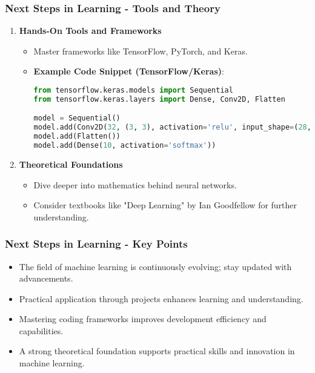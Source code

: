 \documentclass[aspectratio=169]{beamer}
\begin{document}
\begin{frame}[fragile]
    \frametitle{Next Steps in Learning - Tools and Theory}
    \begin{enumerate}
        \item \textbf{Hands-On Tools and Frameworks}
            \begin{itemize}
                \item Master frameworks like TensorFlow, PyTorch, and Keras.
                \item \textbf{Example Code Snippet (TensorFlow/Keras)}:
                \begin{lstlisting}[language=Python]
from tensorflow.keras.models import Sequential
from tensorflow.keras.layers import Dense, Conv2D, Flatten

model = Sequential()
model.add(Conv2D(32, (3, 3), activation='relu', input_shape=(28, 28, 1)))
model.add(Flatten())
model.add(Dense(10, activation='softmax'))
                \end{lstlisting}
            \end{itemize}
            
        \item \textbf{Theoretical Foundations}
            \begin{itemize}
                \item Dive deeper into mathematics behind neural networks.
                \item Consider textbooks like "Deep Learning" by Ian Goodfellow for further understanding.
            \end{itemize}
    \end{enumerate}
\end{frame}

\begin{frame}[fragile]
    \frametitle{Next Steps in Learning - Key Points}
    \begin{itemize}
        \item The field of machine learning is continuously evolving; stay updated with advancements.
        \item Practical application through projects enhances learning and understanding.
        \item Mastering coding frameworks improves development efficiency and capabilities.
        \item A strong theoretical foundation supports practical skills and innovation in machine learning.
    \end{itemize}
\end{frame}
\end{document}
